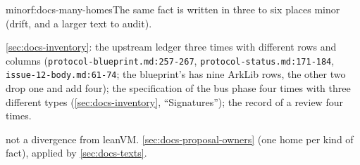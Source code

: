 \begin{finding}{minor}{f:docs-many-homes}{The same fact is written in three to six places}
 minor (drift, and a larger text to audit).
 \begin{sloppypar}
\cref{sec:docs-inventory}: the upstream ledger three times with different rows and columns (\texttt{protocol-\allowbreak{}blueprint.\allowbreak{}md:\allowbreak{}257-\allowbreak{}267}, \texttt{protocol-\allowbreak{}status.\allowbreak{}md:\allowbreak{}171-\allowbreak{}184}, \texttt{issue-\allowbreak{}12-\allowbreak{}body.\allowbreak{}md:\allowbreak{}61-\allowbreak{}74}; the blueprint's has nine ArkLib rows, the other two drop one and add four); the specification of the bus phase four times with three different types (\cref{sec:docs-inventory}, ``Signatures''); the record of a review four times.
\end{sloppypar}
 not a divergence from leanVM.
 \cref{sec:docs-proposal-owners} (one home per kind of fact), applied by \cref{sec:docs-texts}.
\end{finding}


